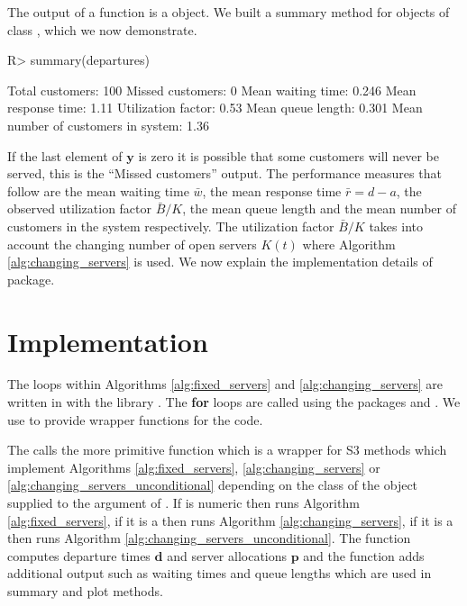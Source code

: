 \documentclass[article]{jss}
\begin{document}
The output of a  function is a  object. We built a summary method for objects of class , which we now demonstrate. 

\begin{CodeChunk}
\begin{CodeInput}
R> summary(departures)
\end{CodeInput}
\begin{CodeOutput}
Total customers:
 100
Missed customers:
 0
Mean waiting time:
 0.246
Mean response time:
 1.11
Utilization factor:
 0.53
Mean queue length:
 0.301
Mean number of customers in system:
 1.36
\end{CodeOutput}
\end{CodeChunk}

If the last element of $\mathbf{y}$ is zero it is possible that some customers will never be served, this is the ``Missed customers'' output. The performance measures that follow are the mean waiting time $\bar{w}$, the mean response time $\bar{r} = d - a$, the observed utilization factor $\bar{B}/K$, the mean queue length and the mean number of customers in the system respectively. The utilization factor $\bar{B}/K$ takes into account the changing number of open servers $K(t)$ where Algorithm \ref{alg:changing_servers} is used. We now explain the implementation details of package.  


\section{Implementation} \label{sec:Implementation}

The  loops within Algorithms \ref{alg:fixed_servers} and \ref{alg:changing_servers} are written in  with the  library \citep{sanderson2016armadillo}. The  \textbf{for} loops are called using the  packages  \citep{eddelbuettel2011rcpp} and  \citep{eddelbuettel2014rcpparmadillo}. We use  to provide wrapper functions for the  code. 

The  calls the more primitive  function which is a wrapper for S3 methods which implement Algorithms \ref{alg:fixed_servers}, \ref{alg:changing_servers} or \ref{alg:changing_servers_unconditional} depending on the class of the object supplied to the  argument of . If  is numeric then  runs Algorithm \ref{alg:fixed_servers}, if it is a  then  runs Algorithm \ref{alg:changing_servers}, if it is a  then  runs Algorithm \ref{alg:changing_servers_unconditional}. The  function computes departure times $\mathbf{d}$ and server allocations $\mathbf{p}$ and the  function adds additional output such as waiting times and queue lengths which are used in summary and plot methods.  
\end{document}
